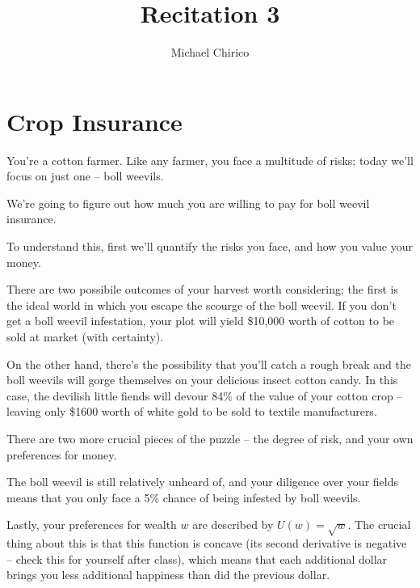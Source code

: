 \documentclass{article}
\begin{document}
\title{Recitation 3}
\author{Michael Chirico}

\maketitle

\section*{Crop Insurance}

You're a cotton farmer. Like any farmer, you face a multitude of risks; today we'll focus on just one -- boll weevils.

We're going to figure out how much you are willing to pay for boll weevil insurance.

To understand this, first we'll quantify the risks you face, and how you value your money.

There are two possibile outcomes of your harvest worth considering; the first is the ideal world in which you escape the scourge of the boll weevil. If you don't get a boll weevil infestation, your plot will yield \$10,000 worth of cotton to be sold at market (with certainty).

On the other hand, there's the possibility that you'll catch a rough break and the boll weevils will gorge themselves on your delicious insect cotton candy. In this case, the devilish little fiends will devour 84\% of the value of your cotton crop -- leaving only \$1600 worth of white gold to be sold to textile manufacturers.

There are two more crucial pieces of the puzzle -- the degree of risk, and your own preferences for money.

The boll weevil is still relatively unheard of, and your diligence over your fields means that you only face a 5\% chance of being infested by boll weevils.

Lastly, your preferences for wealth $w$ are described by $U(w) = \sqrt{w}$. The crucial thing about this is that this function is concave (its second derivative is negative -- check this for yourself after class), which means that each additional dollar brings you less additional happiness than did the previous dollar.
\end{document}
